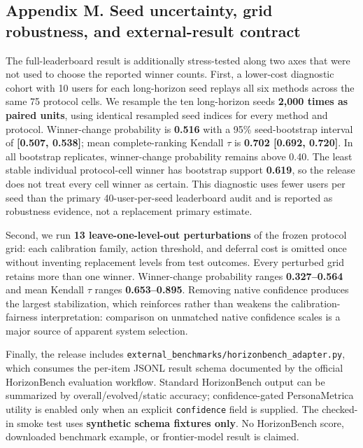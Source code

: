 \subsection{Appendix M. Seed uncertainty, grid robustness, and
external-result
contract}\label{appendix-m.-seed-uncertainty-grid-robustness-and-external-result-contract}

The full-leaderboard result is additionally stress-tested along two axes
that were not used to choose the reported winner counts. First, a
lower-cost diagnostic cohort with 10 users for each long-horizon seed
replays all six methods across the same 75 protocol cells. We resample
the ten long-horizon seeds \textbf{2,000 times as paired units}, using
identical resampled seed indices for every method and protocol.
Winner-change probability is \textbf{0.516} with a 95\% seed-bootstrap
interval of \textbf{{[}0.507, 0.538{]}}; mean complete-ranking Kendall
\(\tau\) is \textbf{0.702 {[}0.692, 0.720{]}}. In all bootstrap
replicates, winner-change probability remains above 0.40. The least
stable individual protocol-cell winner has bootstrap support
\textbf{0.619}, so the release does not treat every cell winner as
certain. This diagnostic uses fewer users per seed than the primary
40-user-per-seed leaderboard audit and is reported as robustness
evidence, not a replacement primary estimate.

Second, we run \textbf{13 leave-one-level-out perturbations} of the
frozen protocol grid: each calibration family, action threshold, and
deferral cost is omitted once without inventing replacement levels from
test outcomes. Every perturbed grid retains more than one winner.
Winner-change probability ranges \textbf{0.327--0.564} and mean Kendall
\(\tau\) ranges \textbf{0.653--0.895}. Removing native confidence
produces the largest stabilization, which reinforces rather than weakens
the calibration-fairness interpretation: comparison on unmatched native
confidence scales is a major source of apparent system selection.

Finally, the release includes
\texttt{external\_benchmarks/horizonbench\_adapter.py}, which consumes
the per-item JSONL result schema documented by the official HorizonBench
evaluation workflow. Standard HorizonBench output can be summarized by
overall/evolved/static accuracy; confidence-gated PersonaMetrica utility
is enabled only when an explicit \texttt{confidence} field is supplied.
The checked-in smoke test uses \textbf{synthetic schema fixtures only}.
No HorizonBench score, downloaded benchmark example, or frontier-model
result is claimed.

